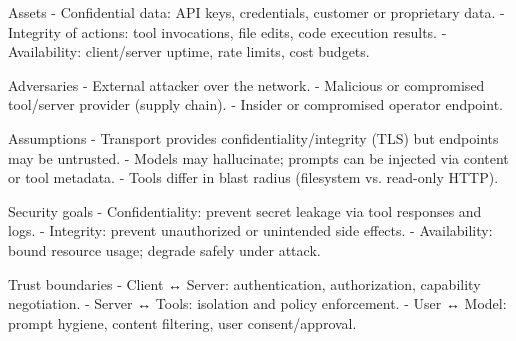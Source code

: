 Assets
- Confidential data: API keys, credentials, customer or proprietary data.
- Integrity of actions: tool invocations, file edits, code execution results.
- Availability: client/server uptime, rate limits, cost budgets.

Adversaries
- External attacker over the network.
- Malicious or compromised tool/server provider (supply chain).
- Insider or compromised operator endpoint.

Assumptions
- Transport provides confidentiality/integrity (TLS) but endpoints may be untrusted.
- Models may hallucinate; prompts can be injected via content or tool metadata.
- Tools differ in blast radius (filesystem vs. read-only HTTP).

Security goals
- Confidentiality: prevent secret leakage via tool responses and logs.
- Integrity: prevent unauthorized or unintended side effects.
- Availability: bound resource usage; degrade safely under attack.

Trust boundaries
- Client ↔ Server: authentication, authorization, capability negotiation.
- Server ↔ Tools: isolation and policy enforcement.
- User ↔ Model: prompt hygiene, content filtering, user consent/approval.

